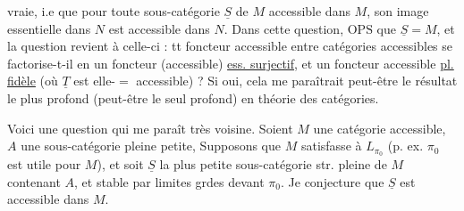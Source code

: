 vraie, i.e que pour toute  sous-catégorie $\underline S$ de $M$ accessible dans $M$,  son image essentielle dans $N$ est accessible dans $N$. Dans cette question, $\mathrm{OPS}$ que $\underline S=M$, et la question revient à celle-ci : tt foncteur accessible  entre catégories accessibles se factorise-t-il en un foncteur (accessible) \uline{ess. surjectif}, et un foncteur accessible \uline{pl. fidèle}  (où $\underline T$ est elle-$=$ accessible) ?
Si oui, cela me paraîtrait peut-être le résultat le plus profond (peut-être le seul  profond) en théorie des catégories.

Voici une question qui me paraît très voisine. Soient $M$ une catégorie accessible, $A$ une sous-catégorie pleine petite, Supposons que $M$ satisfasse à $L_{\pi_0}$ (p. ex. $\pi_0$ est utile pour $M$), et soit $\underline S$ la plus petite sous-catégorie str. pleine de $M$ contenant $A$, et stable par limites grdes devant $\pi_0$.  Je conjecture que $\underline S$ est accessible dans $M$.
